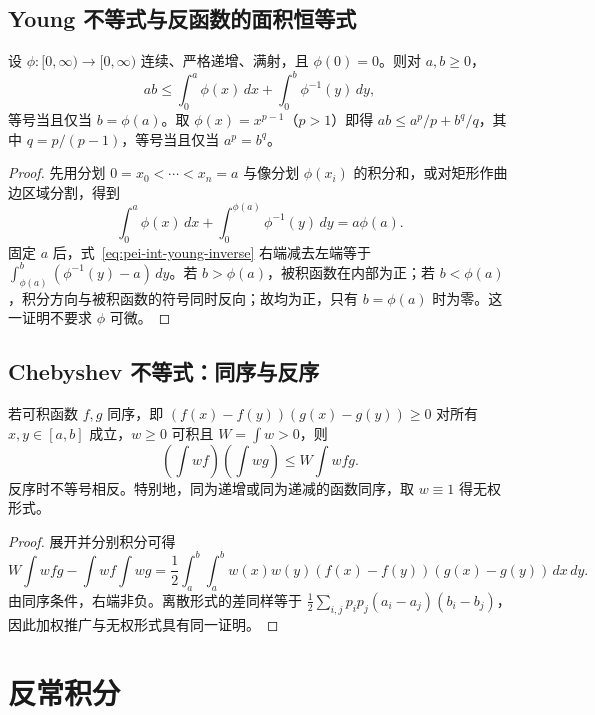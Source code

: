 \subsection{Young 不等式与反函数的面积恒等式}
\begin{theorem}
\label{thm:pei-int-young}
设 $\phi:[0,\infty)\to[0,\infty)$ 连续、严格递增、满射，且 $\phi(0)=0$。则对 $a,b\ge0$，
\begin{equation}
 ab\le\int_0^a\phi(x)\,dx+\int_0^b\phi^{-1}(y)\,dy,
 \label{eq:pei-int-young-inverse}
\end{equation}
等号当且仅当 $b=\phi(a)$。取 $\phi(x)=x^{p-1}$（$p>1$）即得 $ab\le a^p/p+b^q/q$，其中 $q=p/(p-1)$，等号当且仅当 $a^p=b^q$。
\end{theorem}
\begin{proof}
先用分划 $0=x_0<\cdots<x_n=a$ 与像分划 $\phi(x_i)$ 的积分和，或对矩形作曲边区域分割，得到
\[
 \int_0^a\phi(x)\,dx+\int_0^{\phi(a)}\phi^{-1}(y)\,dy=a\phi(a).
\]
固定 $a$ 后，式~\eqref{eq:pei-int-young-inverse} 右端减去左端等于 $\int_{\phi(a)}^b(\phi^{-1}(y)-a)\,dy$。若 $b>\phi(a)$，被积函数在内部为正；若 $b<\phi(a)$，积分方向与被积函数的符号同时反向；故均为正，只有 $b=\phi(a)$ 时为零。这一证明不要求 $\phi$ 可微。
\end{proof}

\subsection{Chebyshev 不等式：同序与反序}
\begin{proposition}
\label{prop:pei-int-chebyshev}
若可积函数 $f,g$ 同序，即 $(f(x)-f(y))(g(x)-g(y))\ge0$ 对所有 $x,y\in[a,b]$ 成立，$w\ge0$ 可积且 $W=\int w>0$，则
\[
 \left(\int wf\right)\left(\int wg\right)\le W\int wfg.
\]
反序时不等号相反。特别地，同为递增或同为递减的函数同序，取 $w\equiv1$ 得无权形式。
\end{proposition}
\begin{proof}
展开并分别积分可得
\[
 W\int wfg-\int wf\int wg
 =\frac12\int_a^b\int_a^b w(x)w(y)(f(x)-f(y))(g(x)-g(y))\,dx\,dy.
\]
由同序条件，右端非负。离散形式的差同样等于 $\tfrac12\sum_{i,j}p_ip_j(a_i-a_j)(b_i-b_j)$，因此加权推广与无权形式具有同一证明。
\end{proof}

\section{反常积分}
\label{sec:pei-int-improper-integrals}

